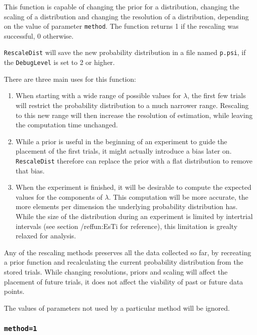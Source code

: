 \documentclass[10pt,letterpaper]{article}
\begin{document}
This function is capable of changing the prior for a distribution, changing the 
scaling of a distribution and changing the resolution of a distribution, 
depending on the value of parameter {\tt method}. The function returns 1 if the 
rescaling was successful, 0 otherwise.

{\tt RescaleDist} will save the new probability distribution in a file named 
{\tt p.psi}, if the {\tt DebugLevel} is set to 2 or higher.

There are three main uses for this function:

\begin{enumerate} 

\item When starting with a wide range of possible values for $\lambda$, the 
first few trials will restrict the probability distribution to a much narrower 
range. Rescaling to this new range will then increase the resolution of 
estimation, while leaving the computation time unchanged.

\item While a prior is useful in the beginning of an experiment to guide the 
placement of the first trials, it might actually introduce a bias later on. {\tt 
RescaleDist} therefore can replace the prior with a flat distribution to remove 
that bias.

\item When the experiment is finished, it will be desirable to compute the 
expected values for the components of $\lambda$. This computation will be more 
accurate, the more elements per dimension the underlying probability 
distribution has. While the size of the distribution during an experiment is 
limited by intertrial intervals (see section /ref{fun:EsTi} for reference), this 
limitation is grealty relaxed for analysis.

\end{enumerate}

Any of the rescaling methods preserves all the data collected so far, by recreating a 
prior function and recalculating the current probability distribution from the 
stored trials. While changing resolutions, priors and scaling will affect the 
placement of future trials, it does not affect the viability of past or future
data points.

The values of parameters not used by a particular method will be ignored.

\subsubsection{\tt method=1}
\end{document}
